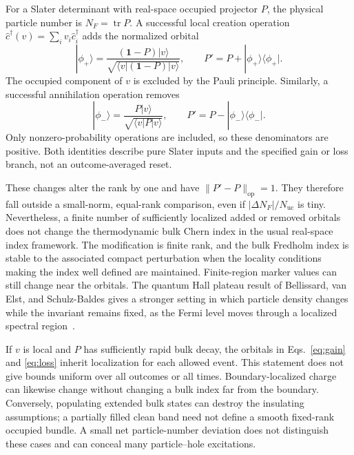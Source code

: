 \documentclass[aps,prb,onecolumn,nofootinbib,superscriptaddress]{revtex4-2}
\newcommand{\id}{\mathbf{1}}
\newcommand{\tr}{\operatorname{tr}}
\begin{document}
For a Slater determinant with real-space occupied projector $P$, the physical particle number is $N_F=\tr P$. A successful local creation operation $\hat c^\dagger(v)=\sum_i v_i\hat c_i^\dagger$ adds the normalized orbital
\begin{equation}
 |\phi_+\rangle=\frac{(\id-P)|v\rangle}{\sqrt{\langle v|(\id-P)|v\rangle}},\qquad
 P'=P+|\phi_+\rangle\langle\phi_+|.
 \label{eq:gain}
\end{equation}
The occupied component of $v$ is excluded by the Pauli principle. Similarly, a successful annihilation operation removes
\begin{equation}
 |\phi_-\rangle=\frac{P|v\rangle}{\sqrt{\langle v|P|v\rangle}},\qquad
 P'=P-|\phi_-\rangle\langle\phi_-|.
 \label{eq:loss}
\end{equation}
Only nonzero-probability operations are included, so these denominators are positive. Both identities describe pure Slater inputs and the specified gain or loss branch, not an outcome-averaged reset.

These changes alter the rank by one and have $\|P'-P\|_{\mathrm{op}}=1$. They therefore fall outside a small-norm, equal-rank comparison, even if $|\Delta N_F|/N_{\mathrm{uc}}$ is tiny. Nevertheless, a finite number of sufficiently localized added or removed orbitals does not change the thermodynamic bulk Chern index in the usual real-space index framework. The modification is finite rank, and the bulk Fredholm index is stable to the associated compact perturbation when the locality conditions making the index well defined are maintained. Finite-region marker values can still change near the orbitals. The quantum Hall plateau result of Bellissard, van Elst, and Schulz-Baldes gives a stronger setting in which particle density changes while the invariant remains fixed, as the Fermi level moves through a localized spectral region~\cite{Bellissard1994}.

If $v$ is local and $P$ has sufficiently rapid bulk decay, the orbitals in Eqs.~\eqref{eq:gain} and \eqref{eq:loss} inherit localization for each allowed event. This statement does not give bounds uniform over all outcomes or all times. Boundary-localized charge can likewise change without changing a bulk index far from the boundary. Conversely, populating extended bulk states can destroy the insulating assumptions; a partially filled clean band need not define a smooth fixed-rank occupied bundle. A small net particle-number deviation does not distinguish these cases and can conceal many particle--hole excitations.
\end{document}
